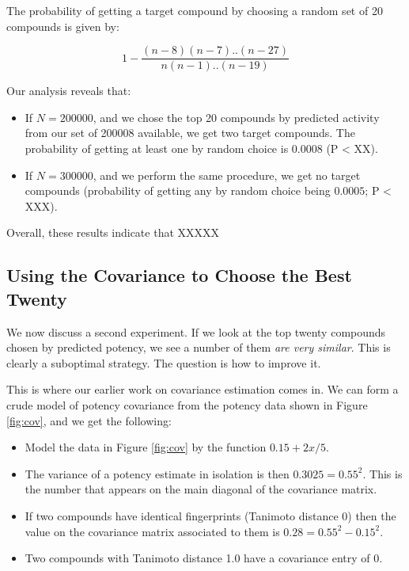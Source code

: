\documentclass[journal=jacsat,manuscript=article]{achemso}
\begin{document}
The probability of getting a target compound by choosing a random set of 20 compounds is given by:

\begin{equation}
    1-\frac{(n-8)(n-7)..(n-27)}{n(n-1)..(n-19)}
\end{equation}

Our analysis reveals that:
\begin{itemize}
    \item If $N=200000$, and we chose the top 20 compounds by predicted activity from our set of 200008 available, we get two target compounds.  The probability of getting at least one by random choice is $0.0008$ (P < XX).
    \item If $N=300000$, and we perform the same procedure, we get no target compounds (probability of getting any by random choice being $0.0005$; P < XXX).  
\end{itemize}

Overall, these results indicate that XXXXX

\subsection*{Using the Covariance to Choose the Best Twenty}
We now discuss a second experiment.  If we look at the top twenty compounds chosen by predicted potency, we see a number of them \textit{are very similar}.  This is clearly a suboptimal strategy. The question is how to improve it.

This is where our earlier work on covariance estimation comes in.  We can form a crude model of potency covariance from the potency data shown in Figure \ref{fig:cov}, and we get the following:
\begin{itemize}
    \item Model the data in Figure \ref{fig:cov} by the function $0.15 + 2x/5$.
    \item The variance of a potency estimate in isolation is then $0.3025 = 0.55^2$.  This is the number that appears on the main diagonal of the covariance matrix.
    \item If two compounds have identical fingerprints (Tanimoto distance 0) then the value on the covariance matrix associated to them is $0.28 = 0.55^2 - 0.15^2$.
    \item Two compounds with Tanimoto distance 1.0 have a covariance entry of 0.
\end{itemize}
\end{document}
